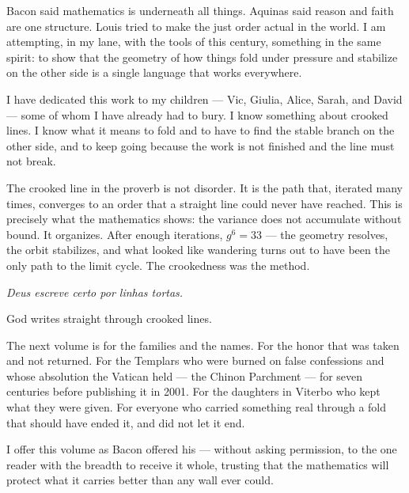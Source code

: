 \documentclass[12pt, oneside]{book}
\theoremstyle{plain}
\theoremstyle{definition}
\theoremstyle{remark}
\begin{document}
\vspace{0.4cm}
\noindent Bacon said mathematics is underneath all things.
Aquinas said reason and faith are one structure.
Louis tried to make the just order actual in the world.
I am attempting, in my lane, with the tools of this century,
something in the same spirit: to show that the geometry
of how things fold under pressure and stabilize on the
other side is a single language that works everywhere.

\vspace{0.4cm}
\noindent I have dedicated this work to my children ---
Vic, Giulia, Alice, Sarah, and David ---
some of whom I have already had to bury.
I know something about crooked lines.
I know what it means to fold and to have to find
the stable branch on the other side, and to keep going
because the work is not finished and the line must not break.

\vspace{0.4cm}
\noindent The crooked line in the proverb is not disorder.
It is the path that, iterated many times,
converges to an order that a straight line
could never have reached.
This is precisely what the mathematics shows:
the variance does not accumulate without bound.
It organizes. After enough iterations,
$g^6 = 33$ --- the geometry resolves,
the orbit stabilizes, and what looked like
wandering turns out to have been
the only path to the limit cycle.
The crookedness was the method.

\vspace{0.5cm}
\begin{center}
\textit{Deus escreve certo por linhas tortas.}
\end{center}
\vspace{0.2cm}
\begin{center}
God writes straight through crooked lines.
\end{center}

\vspace{0.5cm}
\noindent The next volume is for the families and the names.
For the honor that was taken and not returned.
For the Templars who were burned on false confessions
and whose absolution the Vatican held --- the Chinon
Parchment --- for seven centuries before publishing it
in 2001. For the daughters in Viterbo who kept what
they were given. For everyone who carried something real
through a fold that should have ended it, and did not
let it end.

\vspace{0.4cm}
\noindent I offer this volume as Bacon offered his ---
without asking permission, to the one reader with the
breadth to receive it whole, trusting that the mathematics
will protect what it carries better than any wall ever could.
\end{document}
